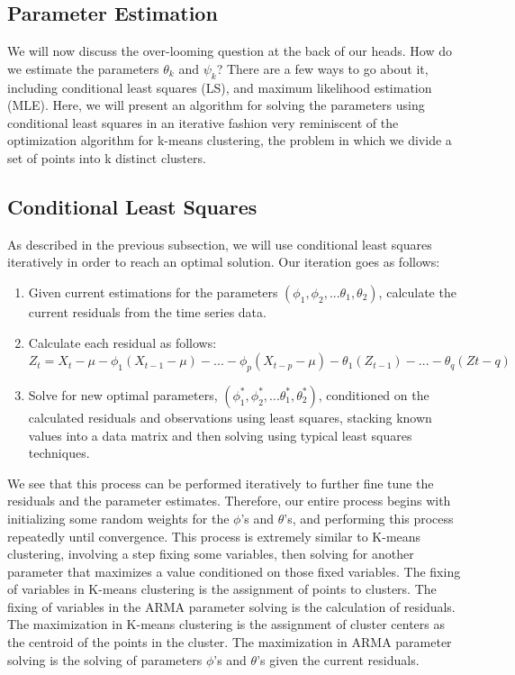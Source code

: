 \documentclass{article}
\begin{document}
\subsection{Parameter Estimation}
We will now discuss the over-looming question at the back of our heads. How do we estimate the parameters $\theta_k$ and $\psi_k$? There are a few ways to go about it, including conditional least squares (LS), and maximum likelihood estimation (MLE). Here, we will present an algorithm for solving the parameters using conditional least squares in an iterative fashion very reminiscent of the optimization algorithm for k-means clustering, the problem in which we divide a set of points into k distinct clusters.

\subsection{Conditional Least Squares}
As described in the previous subsection, we will use conditional least squares iteratively in order to reach an optimal solution. Our iteration goes as follows:

\begin{enumerate}
    \item Given current estimations for the parameters $(\phi_{1}, \phi_{2}, ... \theta_{1}, \theta_{2})$, calculate the current residuals from the time series data.
    \item Calculate each residual as follows: \\
    $Z_{t} = X_{t} - \mu - \phi_1(X_{t-1} - \mu) - ... - \phi_{p}(X_{t-p} - \mu) - \theta_{1}(Z_{t-1}) - ... - \theta_{q}(Z{t-q})$
    \item Solve for new optimal parameters, $(\phi_{1}^*, \phi_{2}^*, ... \theta_{1}^*, \theta_{2}^*)$, conditioned on the calculated residuals and observations using least squares, stacking known values into a data matrix and then solving using typical least squares techniques.
\end{enumerate}

We see that this process can be performed iteratively to further fine tune the residuals and the parameter estimates. Therefore, our entire process begins with initializing some random weights for the $\phi$'s and $\theta$'s, and performing this process repeatedly until convergence. This process is extremely similar to K-means clustering, involving a step fixing some variables, then solving for another parameter that maximizes a value conditioned on those fixed variables. The fixing of variables in K-means clustering is the assignment of points to clusters. The fixing of variables in the ARMA parameter solving is the calculation of residuals. The maximization in K-means clustering is the assignment of cluster centers as the centroid of the points in the cluster. The maximization in ARMA parameter solving is the solving of parameters $\phi$'s and $\theta$'s given the current residuals.
\end{document}
